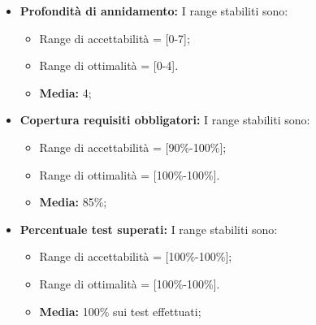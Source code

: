 \begin{itemize}
		\item \textbf{Profondità di annidamento: }I range stabiliti sono:
      \begin{itemize}
        \item Range di accettabilità = [0-7];
        \item Range di ottimalità = [0-4].
        \item \textbf{Media: }4;
      \end{itemize}      
      
      
      \item \textbf{Copertura requisiti obbligatori: }I range stabiliti sono:
      \begin{itemize}
        \item Range di accettabilità = [90\%-100\%];
        \item Range di ottimalità = [100\%-100\%].
        \item \textbf{Media: }85\%;
      \end{itemize}
      
\item \textbf{Percentuale test superati: }I range stabiliti sono:
      \begin{itemize}
        \item Range di accettabilità = [100\%-100\%];
        \item Range di ottimalità = [100\%-100\%].
        \item \textbf{Media: }100\% sui test effettuati;
      \end{itemize}

\end{itemize}